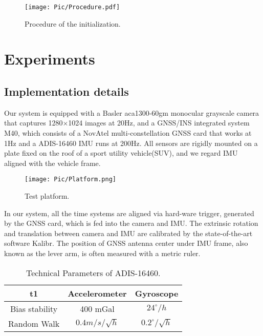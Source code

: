 \documentclass[journal,article,submit,moreauthors,pdftex]{Definitions/mdpi}
\begin{document}
\begin{figure}[H]
	\centering
	\texttt{[image: Pic/Procedure.pdf]}
	\caption{Procedure of the initialization.}
	\label{Procedure}
\end{figure} 

\section{Experiments}
\label{Experiments}
\subsection{Implementation details}

Our system is equipped with a Basler aca1300-60gm monocular grayscale 
camera that captures 1280$\times$1024 images at 20Hz, and a GNSS/INS 
integrated system M40, which consists of a NovAtel multi-constellation 
GNSS card that works at 1Hz and a ADIS-16460 IMU runs at 200Hz.
All sensors are rigidly mounted on a plate fixed on the roof of a sport utility
vehicle(SUV), and we regard IMU aligned with the vehicle frame.
\begin{figure}[H]
	\centering
	\texttt{[image: Pic/Platform.png]}
	\caption{Test platform.}
	\label{Plateform}
\end{figure}

In our system, all the time systems are aligned via hard-ware trigger, 
generated by the GNSS card, which is fed into the camera and IMU. 
The extrinsic rotation and translation between camera and IMU are 
calibrated by the state-of-the-art software Kalibr\cite{rehderExtendingKalibrCalibrating2016}.
The position of GNSS antenna center under IMU frame, also known as the  
lever arm, is often measured with a metric ruler.


\begin{table}[H]
	\caption{Technical Parameters of ADIS-16460.}
	\centering
	\begin{tabular}{ccc}
		\toprule
		t1             & Accelerometer      & Gyroscope               \\
		\midrule
		Bias stability & 400 mGal           & $24 ^{\circ}/h$         \\
		Random Walk    & $0.4 m/s/\sqrt{h}$ & $0.2 ^{\circ}/\sqrt{h}$ \\
		\bottomrule
	\end{tabular}
	\label{ADIS}
\end{table}
\end{document}
